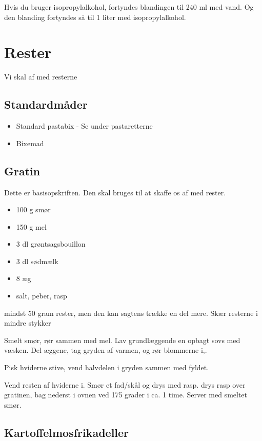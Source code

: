 \documentclass[
]{book}
\providecommand{\tightlist}{%
  \setlength{\itemsep}{0pt}\setlength{\parskip}{0pt}}
\begin{document}
Hvis du bruger isopropylalkohol, fortyndes blandingen til 240 ml med vand. Og den blanding fortyndes så til 1 liter med isopropylalkohol.

\chapter{Rester}\label{rester}

Vi skal af med resterne

\section{Standardmåder}\label{standardmuxe5der}

\begin{itemize}
\tightlist
\item
  Standard pastabix - Se under pastaretterne
\item
  Bixemad
\end{itemize}

\section{Gratin}\label{gratin}

Dette er basisopskriften. Den skal bruges til at skaffe os af med rester.

\begin{itemize}
\tightlist
\item
  100 g smør
\item
  150 g mel
\item
  3 dl grøntsagsbouillon
\item
  3 dl sødmælk
\item
  8 æg
\item
  salt, peber, rasp
\end{itemize}

mindst 50 gram rester, men den kan sagtens trække en del mere.
Skær resterne i mindre stykker

Smelt smør, rør sammen med mel. Lav grundlæggende en opbagt
sovs med væsken.
Del æggene, tag gryden af varmen, og rør blommerne i,.

Pisk hviderne stive, vend halvdelen i gryden sammen med fyldet.

Vend resten af hviderne i. Smør et fad/skål
og drys med rasp. drys rasp over gratinen, bag nederst i ovnen
ved 175 grader i ca. 1 time. Server med smeltet smør.

\section{Kartoffelmosfrikadeller}\label{kartoffelmosfrikadeller}
\end{document}
